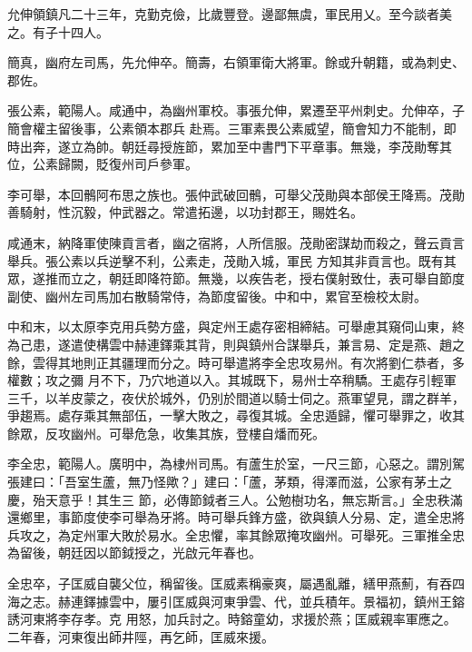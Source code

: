 \begin{pinyinscope}
 允伸領鎮凡二十三年，克勤克儉，比歲豐登。邊鄙無虞，軍民用乂。至今談者美之。有子十四人。



 簡真，幽府左司馬，先允伸卒。簡壽，右領軍衛大將軍。餘或升朝籍，或為刺史、郡佐。



 張公素，範陽人。咸通中，為幽州軍校。事張允伸，累遷至平州刺史。允伸卒，子簡會權主留後事，公素領本郡兵
 赴焉。三軍素畏公素威望，簡會知力不能制，即時出奔，遂立為帥。朝廷尋授旌節，累加至中書門下平章事。無幾，李茂勛奪其位，公素歸闕，貶復州司戶參軍。



 李可舉，本回鶻阿布思之族也。張仲武破回鶻，可舉父茂勛與本部侯王降焉。茂勛善騎射，性沉毅，仲武器之。常遣拓邊，以功封郡王，賜姓名。



 咸通末，納降軍使陳貢言者，幽之宿將，人所信服。茂勛密謀劫而殺之，聲云貢言舉兵。張公素以兵逆擊不利，公素走，茂勛入城，軍民
 方知其非貢言也。既有其眾，遂推而立之，朝廷即降符節。無幾，以疾告老，授右僕射致仕，表可舉自節度副使、幽州左司馬加右散騎常侍，為節度留後。中和中，累官至檢校太尉。



 中和末，以太原李克用兵勢方盛，與定州王處存密相締結。可舉慮其窺伺山東，終為己患，遂遣使構雲中赫連鐸乘其背，則與鎮州合謀舉兵，兼言易、定是燕、趙之餘，雲得其地則正其疆理而分之。時可舉遣將李全忠攻易州。有次將劉仁恭者，多權數；攻之彌
 月不下，乃穴地道以入。其城既下，易州士卒稍驕。王處存引輕軍三千，以羊皮蒙之，夜伏於城外，仍別於間道以騎士伺之。燕軍望見，謂之群羊，爭趨焉。處存乘其無部伍，一擊大敗之，尋復其城。全忠遁歸，懼可舉罪之，收其餘眾，反攻幽州。可舉危急，收集其族，登樓自燔而死。



 李全忠，範陽人。廣明中，為棣州司馬。有蘆生於室，一尺三節，心惡之。謂別駕張建曰：「吾室生蘆，無乃怪歟？」建曰：「蘆，茅類，得澤而滋，公家有茅土之慶，殆天意乎！其生三
 節，必傳節鉞者三人。公勉樹功名，無忘斯言。」全忠秩滿還鄉里，事節度使李可舉為牙將。時可舉兵鋒方盛，欲與鎮人分易、定，遣全忠將兵攻之，為定州軍大敗於易水。全忠懼，率其餘眾掩攻幽州。可舉死。三軍推全忠為留後，朝廷因以節鉞授之，光啟元年春也。



 全忠卒，子匡威自襲父位，稱留後。匡威素稱豪爽，屬遇亂離，繕甲燕薊，有吞四海之志。赫連鐸據雲中，屢引匡威與河東爭雲、代，並兵積年。景福初，鎮州王鎔誘河東將李存孝。克
 用怒，加兵討之。時鎔童幼，求援於燕；匡威親率軍應之。二年春，河東復出師井陘，再乞師，匡威來援。




\end{pinyinscope}
